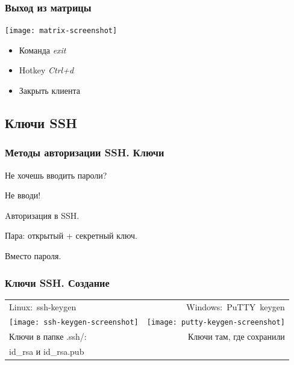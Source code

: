 \begin{frame}
  \frametitle{Выход из матрицы}
  
  \begin{center}
    \texttt{[image: matrix-screenshot]}
    \pause
    \newline
    \begin{itemize}
      \item Команда \emph{exit}
      \item Hotkey \emph{Ctrl+d}
      \item Закрыть клиента
    \end{itemize}
  \end{center}

\end{frame}

\subsection{Ключи SSH}

\begin{frame}
  \frametitle{Методы авторизации SSH. Ключи}

  \alert{Не хочешь вводить пароли?}
  \pause

  \alert{Не вводи!} 
  \pause

  \begin{center}
    Aвторизация в SSH.
    
    Пара: открытый + секретный ключ. 
    
    Вместо пароля.
  \end{center}

\end{frame}

\begin{frame}
  \frametitle{Ключи SSH. Создание}

  \begin{center}

    \begin{tabular}{ l r }
      \hbox{Linux: ssh-keygen} & \hbox{Windows: PuTTY keygen} \\
      \texttt{[image: ssh-keygen-screenshot]} & \texttt{[image: putty-keygen-screenshot]} \\
      Ключи в папке .ssh/: & Ключи там, где сохранили \\
      id\_rsa и id\_rsa.pub &
    \end{tabular}

  \end{center}

\end{frame}

